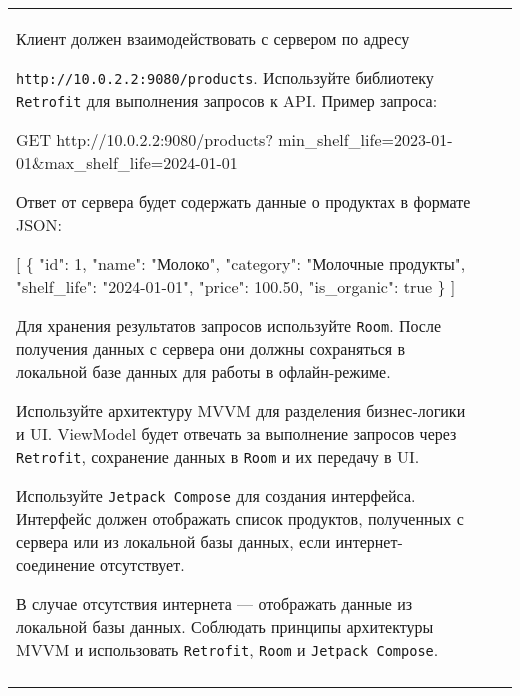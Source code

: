 \documentclass[a4paper]{article}
\begin{document}
\begin{tabular}{!{\vrule width 2pt}p{5cm}|p{6cm}|p{4cm}!{\vrule width 2pt}}
{\begin{minipage}{16cm}
\begin{enumerate}
Клиент должен взаимодействовать с сервером по адресу 

\texttt{http://10.0.2.2:9080/products}. Используйте библиотеку \texttt{Retrofit} для выполнения запросов к API. Пример запроса:


GET http://10.0.2.2:9080/products?
min\_shelf\_life=2023-01-01\&max\_shelf\_life=2024-01-01


Ответ от сервера будет содержать данные о продуктах в формате JSON:


[
  \{
    "id": 1,
    "name": "Молоко",
    "category": "Молочные продукты",
    "shelf\_life": "2024-01-01",
    "price": 100.50,
    "is\_organic": true
  \}
]


Для хранения результатов запросов используйте \texttt{Room}. После получения данных с сервера они должны сохраняться в локальной базе данных для работы в офлайн-режиме.

Используйте архитектуру MVVM для разделения бизнес-логики и UI. ViewModel будет отвечать за выполнение запросов через \texttt{Retrofit}, сохранение данных в \texttt{Room} и их передачу в UI.

Используйте \texttt{Jetpack Compose} для создания интерфейса. Интерфейс должен отображать список продуктов, полученных с сервера или из локальной базы данных, если интернет-соединение отсутствует.

В случае отсутствия интернета — отображать данные из локальной базы данных.
Соблюдать принципы архитектуры MVVM и использовать \texttt{Retrofit}, \texttt{Room} и \texttt{Jetpack Compose}. 
\end{enumerate}

\vspace{0.2cm}
    
\end{minipage}
}
\\
\end{tabular}

\newpage
\end{document}
